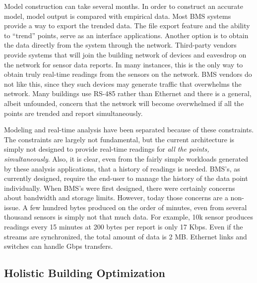 Model construction can take several months.  In order to construct an accurate model, model output is compared with
empirical data.  Most BMS systems provide a way to export the  trended data.  
The file export feature and the ability to ``trend'' points, serve as an interface applications.
Another option is to obtain the data directly from the system through the network.  Third-party vendors provide systems that 
will join the building network of devices and eavesdrop on the network for sensor data reports.  %
In many instances, this is the only way to obtain truly real-time readings from the sensors on the network.
BMS vendors do not like this, since they such devices may generate traffic that overwhelms the network.  %
Many buildings use RS-485 rather than Ethernet and there is
a general, albeit unfounded, concern that the network will become overwhelmed if all the points are trended and report 
simultaneously.

Modeling and real-time analysis have been separated because of these constraints.  The constraints are largely not
fundamental, but the current architecture is simply not designed to provide real-time readings for \emph{all the points, simultaneously}.
Also, it is clear, even from the fairly simple workloads generated by these analysis applications, that a history of readings
is needed.  BMS's, as currently designed, require the end-user to manage the history of the data point individually.
When BMS's were first designed, there were certainly concerns about bandwidth and storage limits.  However, today those concerns
are a non-issue.  A few hundred bytes produced on the order of minutes, even from several thousand sensors is simply not
that much data.  For example, 10k sensor produces readings every 15 minutes at 200 bytes per report is only 
17 Kbps.  Even if the streams are synchronized, the total amount of data is 2 MB.  Ethernet links and switches can handle Gbps 
transfers.


\subsection{Holistic Building Optimization}

